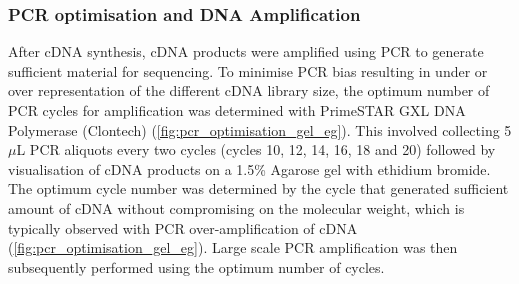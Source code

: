 \clearpage
\subsubsection{PCR optimisation and DNA Amplification}\label{ch: pcr_optimisation}
After cDNA synthesis, cDNA products were amplified using PCR to generate sufficient material for sequencing. To minimise PCR bias resulting in under or over representation of the different cDNA library size, the optimum number of PCR cycles for amplification was determined with PrimeSTAR GXL DNA Polymerase (Clontech) (\cref{fig:pcr_optimisation_gel_eg}). This involved collecting 5$\mu$L PCR aliquots every two cycles (cycles 10, 12, 14, 16, 18 and 20) followed by visualisation of cDNA products on a 1.5\% Agarose gel with ethidium bromide. The optimum cycle number was determined by the cycle that generated sufficient amount of cDNA without compromising on the molecular weight, which is typically observed with PCR over-amplification of cDNA (\cref{fig:pcr_optimisation_gel_eg}). Large scale PCR amplification was then subsequently performed using the optimum number of cycles. 

